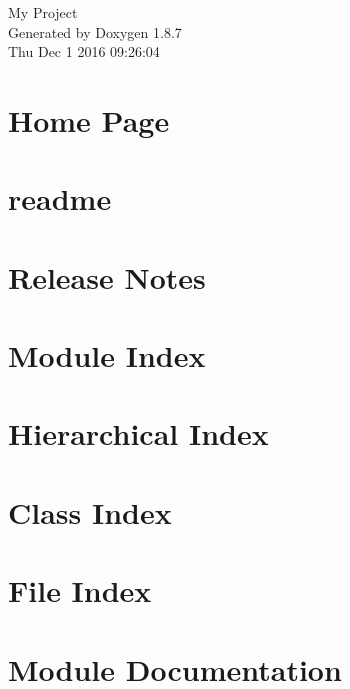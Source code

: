 \documentclass[twoside]{book}
\newcommand{\+}{\discretionary{\mbox{\scriptsize$\hookleftarrow$}}{}{}}
\newcommand{\clearemptydoublepage}{%
  \newpage{\pagestyle{empty}\cleardoublepage}%
}
\begin{document}
\hypersetup{pageanchor=false,
             bookmarks=true,
             bookmarksnumbered=true,
             pdfencoding=unicode
            }
\begin{titlepage}
\vspace*{7cm}
\begin{center}%
{\Large My Project }\\
\vspace*{1cm}
{\large Generated by Doxygen 1.8.7}\\
\vspace*{0.5cm}
{\small Thu Dec 1 2016 09:26:04}\\
\end{center}
\end{titlepage}
\clearemptydoublepage
\tableofcontents
\clearemptydoublepage
{}
\hypersetup{pageanchor=true}

\chapter{Home Page}
\label{index}\hypertarget{index}{}
\chapter{readme}
\label{md_readme}
\hypertarget{md_readme}{}

\chapter{Release Notes}
\label{md_release_notes}
\hypertarget{md_release_notes}{}

\chapter{Module Index}

\chapter{Hierarchical Index}

\chapter{Class Index}

\chapter{File Index}

\chapter{Module Documentation}





\end{document}
